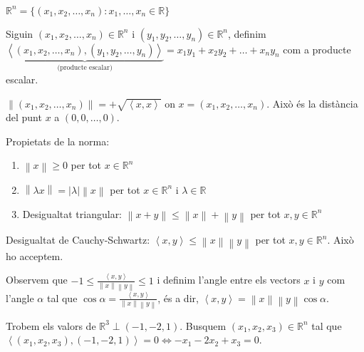 \documentclass[../main.tex]{subfiles}
\begin{document}
    \begin{definicio}
        $\mathbb{R}^n = \{\left( x_1, x_2, \dots, x_n \right): x_1, \dots, x_n \in \mathbb{R}\}$
    \end{definicio}
    \begin{definicio}
        Siguin $\left( x_1, x_2, \dots, x_n \right) \in \mathbb{R}^n$ i $\left( y_1, y_2, \dots, y_n \right) \in \mathbb{R}^n$,
        definim $\underbrace{\left\langle \left( x_1, x_2, \dots, x_n \right), \left( y_1, y_2, \dots, y_n \right) \right\rangle }_\text{ (producte escalar) } = x_1y_1 + x_2y_2 + \dots + x_ny_n$
        com a producte escalar.
    \end{definicio}
    \begin{definicio}
        $\left\lVert \left( x_1, x_2, \dots, x_n \right) \right\rVert = +\sqrt{\left\langle x, x \right\rangle }$ on $x = \left( x_1, x_2, \dots, x_n \right)$. Això és
        la distància del punt $x$ a $\left( 0, 0, \dots, 0 \right)$.  
    \end{definicio}
    Propietats de la norma:
    \begin{enumerate}
        \item $\left\lVert x\right\rVert \geq 0$ per tot $x \in \mathbb{R}^n$
        \item $\left\lVert \lambda x \right\rVert = \left\lvert \lambda \right\rvert \left\lVert x \right\rVert$ per tot $x \in \mathbb{R}^n$ i $\lambda \in \mathbb{R}$
        \item Desigualtat triangular: $\left\lVert x+y \right\rVert \leq \left\lVert x \right\rVert + \left\lVert y \right\rVert$ per tot $x, y \in \mathbb{R}^n$
    \end{enumerate}
    Desigualtat de Cauchy-Schwartz: $\left\langle x,y \right\rangle  \leq \left\lVert x\right\rVert\left\lVert y\right\rVert$ per tot $x, y \in \mathbb{R}^n$. Això ho
    acceptem.
    \begin{obs}
        Observem que $-1 \leq \frac{\left\langle x,y \right\rangle }{\left\lVert x \right\rVert\left\lVert y \right\rVert} \leq 1$ i definim l'angle entre els vectors $x$ i $y$
        com l'angle $\alpha$ tal que $\cos{\alpha} = \frac{\left\langle x,y \right\rangle }{\left\lVert x \right\rVert\left\lVert y\right\rVert}$,
        és a dir, $\left\langle x,y \right\rangle  = \left\lVert x \right\rVert\left\lVert y \right\rVert\cos{\alpha}$.
    \end{obs}
    \begin{exemple}
        Trobem els valors de $\mathbb{R}^3 \perp (-1, -2, 1)$. Busquem $\left( x_1, x_2, x_3 \right) \in \mathbb{R}^n$
        tal que $\left\langle \left( x_1, x_2, x_3 \right), (-1, -2, 1) \right\rangle  = 0 \Leftrightarrow -x_1-2x_2+x_3=0$.
    \end{exemple}
\end{document}
